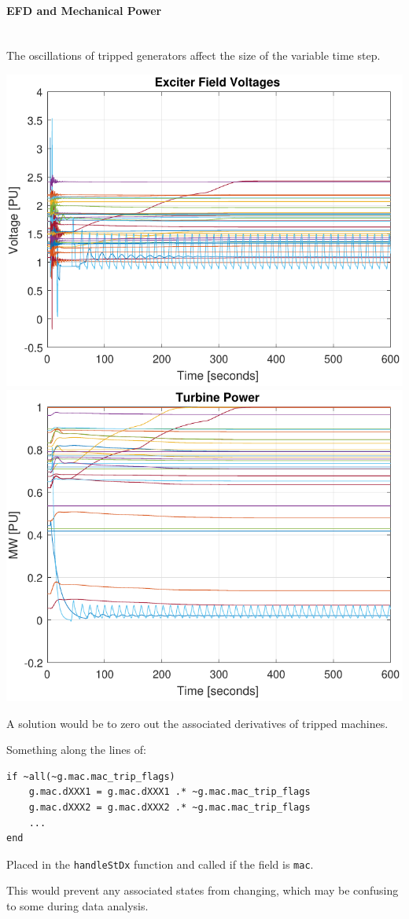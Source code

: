 \documentclass[12pt]{article}
\begin{document}
\pagebreak
\paragraph{EFD and Mechanical Power} \ \\
The oscillations of tripped generators affect the size of the variable time step.

\begin{center}
\includegraphics[width=.5\linewidth]{genTripEFD01}%
\includegraphics[width=.5\linewidth]{genTripPOW01}
\end{center}

A solution would be to zero out the associated derivatives of tripped machines.

Something along the lines of:
\begin{verbatim}
if ~all(~g.mac.mac_trip_flags)
	g.mac.dXXX1 = g.mac.dXXX1 .* ~g.mac.mac_trip_flags
	g.mac.dXXX2 = g.mac.dXXX2 .* ~g.mac.mac_trip_flags
	...
end
\end{verbatim}

Placed in the \verb|handleStDx| function and called if the field is \verb|mac|.


This would prevent any associated states from changing, which may be confusing to some during data analysis.
\end{document}
